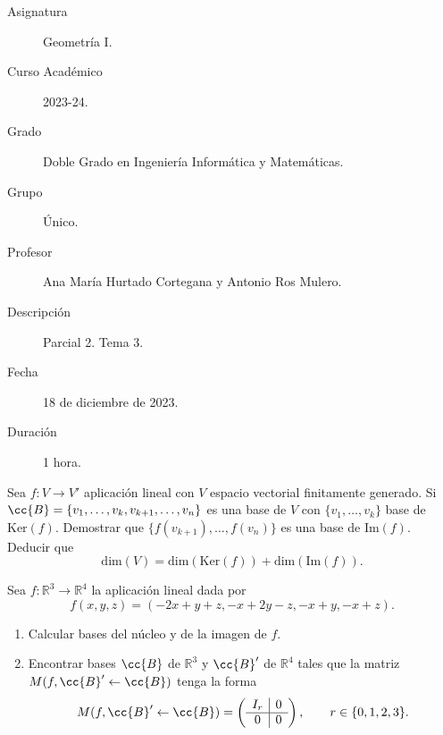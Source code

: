 \documentclass[12pt]{article}
\begin{document}

    
    

    \begin{description}
        \item[Asignatura] Geometría I.
        \item[Curso Académico] 2023-24.
        \item[Grado] Doble Grado en Ingeniería Informática y Matemáticas.
        \item[Grupo] Único.
        \item[Profesor] Ana María Hurtado Cortegana y Antonio Ros Mulero.
        \item[Descripción] Parcial 2. Tema 3.
        \item[Fecha] 18 de diciembre de 2023.
        \item[Duración] 1 hora.
    
    \end{description}
    \newpage

    \begin{ejercicio}
        [4 puntos] Sea $f : V \to V'$ aplicación lineal con $V$ espacio vectorial finitamente generado. Si $\cc{B} = \{v_1, \ldots, v_k, v_{k+1}, \ldots, v_n\}$ es una base de $V$ con $\{v_1, \ldots, v_k\}$ base de $\text{Ker}(f)$. Demostrar que $\{f(v_{k+1}), \ldots, f(v_n)\}$ es una base de $\text{Im}(f)$. Deducir que
        \[
        \text{dim}(V) = \text{dim}(\text{Ker}(f)) + \text{dim}(\text{Im}(f)).
        \]
    \end{ejercicio}
        
    \begin{ejercicio}
        [6 puntos] Sea $f : \mathbb{R}^3 \to \mathbb{R}^4$ la aplicación lineal dada por
        \[
        f(x, y, z) = (-2x + y + z, -x + 2y - z, -x + y, -x + z).
        \]
        \begin{enumerate}
            \item Calcular bases del núcleo y de la imagen de $f$.
            \item Encontrar bases $\cc{B}$ de $\mathbb{R}^3$ y $\cc{B}'$ de $\mathbb{R}^4$ tales que la matriz $M(f, \cc{B}' \leftarrow \cc{B})$ tenga la forma
            \begin{equation*}
                M(f, \cc{B}' \leftarrow \cc{B}) = \left(\begin{array}{c|c}
                    I_r & 0 \\
                    \hline
                    0 & 0
                \end{array}\right), \qquad r\in \{0, 1, 2, 3\}.
            \end{equation*}
        \end{enumerate}
    \end{ejercicio}
        
        
\end{document}
